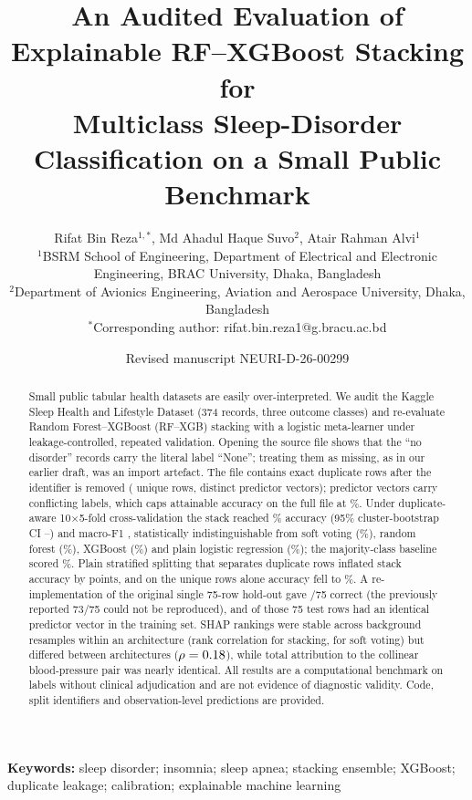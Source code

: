 \documentclass[11pt,a4paper]{article}
\title{An Audited Evaluation of Explainable RF--XGBoost Stacking for\\Multiclass Sleep-Disorder Classification on a Small Public Benchmark}
\author{Rifat Bin Reza$^{1,*}$, Md Ahadul Haque Suvo$^{2}$, Atair Rahman Alvi$^{1}$\\[3pt]
{\small $^{1}$BSRM School of Engineering, Department of Electrical and Electronic Engineering, BRAC University, Dhaka, Bangladesh}\\
{\small $^{2}$Department of Avionics Engineering, Aviation and Aerospace University, Dhaka, Bangladesh}\\
{\small $^{*}$Corresponding author: rifat.bin.reza1@g.bracu.ac.bd}}
\date{Revised manuscript NEURI-D-26-00299}
\begin{document}
\maketitle

\begin{abstract}
\noindent Small public tabular health datasets are easily over-interpreted. We audit the Kaggle Sleep Health and Lifestyle Dataset (374 records, three outcome classes) and re-evaluate Random Forest--XGBoost (RF--XGB) stacking with a logistic meta-learner under leakage-controlled, repeated validation. Opening the source file shows that the \NNone{} ``no disorder'' records carry the literal label ``None''; treating them as missing, as in our earlier draft, was an import artefact. The file contains \NDup{} exact duplicate rows after the identifier is removed (\NUnique{} unique rows, \NVec{} distinct predictor vectors); \NConflictVec{} predictor vectors carry conflicting labels, which caps attainable accuracy on the full file at \Ceiling\%. Under duplicate-aware 10$\times$5-fold cross-validation the stack reached \AccStackG\% accuracy (95\% cluster-bootstrap CI \CIloStackG--\CIhiStackG) and macro-F1 \FStackG, statistically indistinguishable from soft voting (\AccVoteG\%), random forest (\AccRFG\%), XGBoost (\AccXGBG\%) and plain logistic regression (\AccLRG\%); the majority-class baseline scored \AccMajG\%. Plain stratified splitting that separates duplicate rows inflated stack accuracy by \InflationNaiveGrouped{} points, and on the \NUnique{} unique rows alone accuracy fell to \AccStackD\%. A re-implementation of the original single 75-row hold-out gave \OrigStackCorrect/75 correct (the previously reported 73/75 could not be reproduced), and \OrigLeak{} of those 75 test rows had an identical predictor vector in the training set. SHAP rankings were stable across background resamples within an architecture (rank correlation \ShapRhoStack{} for stacking, \ShapRhoVote{} for soft voting) but differed between architectures ($\rho=0.18$), while total attribution to the collinear blood-pressure pair was nearly identical. All results are a computational benchmark on labels without clinical adjudication and are not evidence of diagnostic validity. Code, split identifiers and observation-level predictions are provided.
\end{abstract}

\noindent\textbf{Keywords:} sleep disorder; insomnia; sleep apnea; stacking ensemble; XGBoost; duplicate leakage; calibration; explainable machine learning
\end{document}
